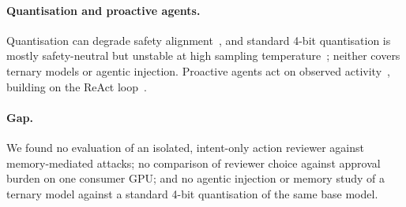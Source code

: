 \paragraph{Quantisation and proactive agents.} Quantisation can degrade safety
alignment~\citep{kharinaev2025quant}, and standard 4-bit quantisation is mostly safety-neutral but
unstable at high sampling temperature~\citep{prasad2026quanttemp}; neither covers ternary models or
agentic injection. Proactive agents act on observed activity~\citep{lu2024proactive,oh2026proactivefoundations},
building on the ReAct loop~\citep{yao2022react}.

\paragraph{Gap.} We found no evaluation of an isolated, intent-only action reviewer against
memory-mediated attacks; no comparison of reviewer choice against approval burden on one consumer GPU;
and no agentic injection or memory study of a ternary model against a standard 4-bit quantisation of
the same base model.
